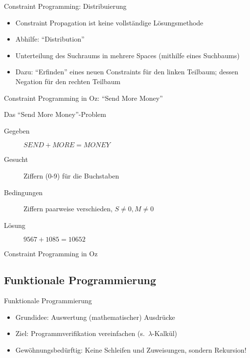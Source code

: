 \begin{frame}{Constraint Programming: Distribuierung}
  \begin{itemize}
    \item Constraint Propagation ist keine vollständige Lösungsmethode
    \item Abhilfe: "`Distribution"'
    \item Unterteilung des Suchraums in mehrere Spaces (mithilfe eines
    Suchbaums) 
    \item Dazu: "`Erfinden"' eines neuen Constraints für den linken Teilbaum;
    dessen Negation für den rechten Teilbaum
  \end{itemize}
\end{frame}

\begin{frame}{Constraint Programming in Oz: "`Send More Money"'}
  \begin{block}{Das "`Send More Money"'-Problem}
    \begin{description}
      \item[Gegeben] $SEND + MORE = MONEY$
      \item[Gesucht] Ziffern (0-9) für die Buchstaben
      \item[Bedingungen] Ziffern paarweise verschieden, $S \neq 0, M \neq 0$
      \item[Lösung] $9567 + 1085 = 10652$
    \end{description}
  \end{block}
\end{frame}

\begin{frame}{Constraint Programming in Oz}
  
  \href{run:oz-constraint.oz}{} 
\end{frame}

\subsection{Funktionale Programmierung}
\begin{frame}{Funktionale Programmierung}
  \begin{itemize}
    \item Grundidee: Auswertung (mathematischer) Ausdrücke
    \item Ziel: Programmverifikation vereinfachen (s.\ $\lambda$-Kalkül)
    \item Gewöhnungsbedürftig: Keine Schleifen und Zuweisungen, sondern 
    Rekursion!
  \end{itemize}
\end{frame}

